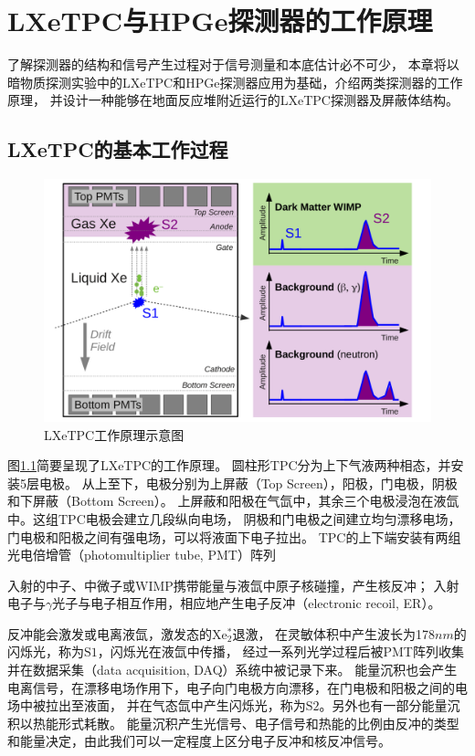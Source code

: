 
\chapter{LXeTPC与HPGe探测器的工作原理}

了解探测器的结构和信号产生过程对于信号测量和本底估计必不可少，
本章将以暗物质探测实验中的LXeTPC和HPGe探测器应用为基础，介绍两类探测器的工作原理，
并设计一种能够在地面反应堆附近运行的LXeTPC探测器及屏蔽体结构。

\section{LXeTPC的基本工作过程}

\begin{figure}
    \centering
    \includegraphics[width=0.7\linewidth]{figures/tpc_signals.png}
    \caption{\label{fig:tpc_principle} LXeTPC工作原理示意图}
\end{figure}

图\ref{fig:tpc_principle}简要呈现了LXeTPC的工作原理\cite{xenon_collaboration_xenon1t_2017}。
圆柱形TPC分为上下气液两种相态，并安装5层电极。
从上至下，电极分别为上屏蔽（Top Screen），阳极，门电极，阴极和下屏蔽（Bottom Screen）。
上屏蔽和阳极在气氙中，其余三个电极浸泡在液氙中。这组TPC电极会建立几段纵向电场，
阴极和门电极之间建立均匀漂移电场，门电极和阳极之间有强电场，可以将液面下电子拉出。
TPC的上下端安装有两组光电倍增管（photomultiplier tube, PMT）阵列

入射的中子、中微子或WIMP携带能量与液氙中原子核碰撞，产生核反冲；
入射电子与$\gamma$光子与电子相互作用，相应地产生电子反冲（electronic recoil, ER）。

反冲能会激发或电离液氙，激发态的$\mathrm{Xe_2^*}$退激，
在灵敏体积中产生波长为178$\si{nm}$的闪烁光，称为$\mathrm{S1}$，闪烁光在液氙中传播，
经过一系列光学过程后被PMT阵列收集并在数据采集（data acquisition, DAQ）系统中被记录下来。
能量沉积也会产生电离信号，在漂移电场作用下，电子向门电极方向漂移，在门电极和阳极之间的电场中被拉出至液面，
并在气态氙中产生闪烁光，称为$\mathrm{S2}$。另外也有一部分能量沉积以热能形式耗散。
能量沉积产生光信号、电子信号和热能的比例由反冲的类型和能量决定，由此我们可以一定程度上区分电子反冲和核反冲信号。


